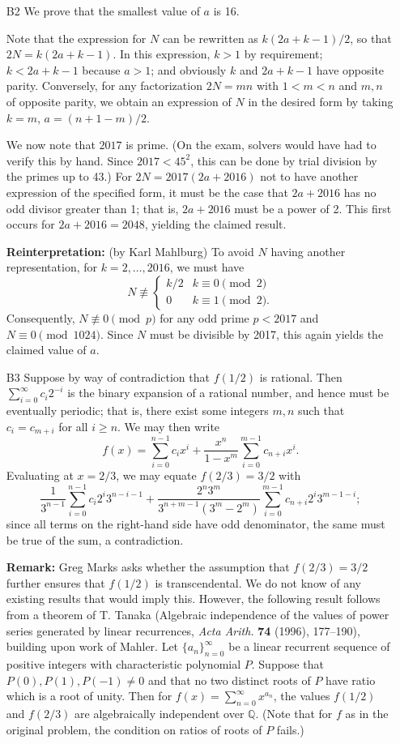 \documentclass[amssymb,twocolumn,pra,10pt,aps]{revtex4-1}
\newcommand{\QQ}{\mathbb{Q}}
\begin{document}
\begin{itemize}
\item[B2]
We prove that the smallest value of $a$ is 16.

Note that the expression for $N$ can be rewritten as $k(2a+k-1)/2$,
so that $2N = k(2a+k-1)$. In this expression, $k>1$ by requirement;
$k < 2a+k-1$ because $a>1$; and obviously $k$ and $2a+k-1$ have opposite parity. Conversely, for any factorization $2N = mn$ with $1<m<n$ and $m,n$ of opposite parity, we obtain an expression of $N$ in the desired form by taking
$k = m$, $a = (n+1-m)/2$.

We now note that $2017$ is prime. (On the exam, solvers would have had to verify this by hand.
Since $2017 < 45^2$, this can be done by trial division by the primes up to 43.)
For $2N = 2017(2a+2016)$ not to have another expression of the specified form, it must be the case that
$2a+2016$ has no odd divisor greater than 1; that is, $2a+2016$ must be a power of 2.
This first occurs for $2a+2016=2048$, yielding the claimed result.

\textbf{Reinterpretation:}
(by Karl Mahlburg)
To avoid $N$ having another representation, for $k = 2, \dots, 2016$, we must have
\[
N \not\equiv \begin{cases} k/2 & k \equiv 0 \pmod{2} \\
0 & k \equiv 1 \pmod{2}.
\end{cases}
\]
Consequently, $N \not\equiv 0 \pmod{p}$ for any odd prime $p<2017$
and $N \equiv 0 \pmod{1024}$. Since $N$ must be divisible by 2017, this again yields the claimed value of $a$.

\item[B3]
Suppose by way of contradiction that $f(1/2)$ is rational. Then $\sum_{i=0}^{\infty} c_i 2^{-i}$ is the binary expansion of a rational number, and hence must be eventually periodic; that is, there exist some integers $m,n$ such that
$c_i = c_{m+i}$ for all $i \geq n$. We may then write
\[
f(x) = \sum_{i=0}^{n-1} c_i x^i + \frac{x^n}{1-x^m} \sum_{i=0}^{m-1} c_{n+i} x^i.
\]
Evaluating at $x = 2/3$, we may equate $f(2/3) = 3/2$ with 
\[
\frac{1}{3^{n-1}} \sum_{i=0}^{n-1} c_i 2^i 3^{n-i-1} + \frac{2^n 3^m}{3^{n+m-1}(3^m-2^m)} \sum_{i=0}^{m-1} c_{n+i} 2^i 3^{m-1-i};
\]
since all terms on the right-hand side have odd denominator, the same must be true of the sum, a contradiction.

\noindent
\textbf{Remark:}
Greg Marks asks whether the assumption that $f(2/3)=3/2$ further ensures that $f(1/2)$ is transcendental. 
We do not know of any existing results that would imply this. However, the following result follows from a theorem of T. Tanaka (Algebraic independence of the values of power series generated by linear recurrences, \textit{Acta Arith.} \textbf{74} (1996), 177--190), building upon work of Mahler.
Let $\{a_n\}_{n=0}^\infty$ be a linear recurrent sequence of positive integers with characteristic polynomial $P$.
Suppose that $P(0), P(1), P(-1) \neq 0$ and that no two distinct roots of $P$ have ratio which is a root of unity. Then
for $f(x) = \sum_{n=0}^\infty x^{a_n}$, the values $f(1/2)$ and $f(2/3)$ are algebraically independent over $\QQ$.
(Note that for $f$ as in the original problem, the condition on ratios of roots of $P$ fails.)



\end{itemize}
\end{document}
